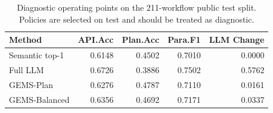 \begin{table}[t]
\centering
\caption{Diagnostic operating points on the 211-workflow public test split. Policies are selected on test and should be treated as diagnostic.}
\label{tab:test211-operating-points}
\begin{tabular}{lrrrr}
\toprule
Method & API.Acc & Plan.Acc & Para.F1 & LLM Change \\
\midrule
Semantic top-1 & 0.6148 & 0.4502 & 0.7010 & 0.0000 \\
Full LLM & 0.6726 & 0.3886 & 0.7502 & 0.5762 \\
\textsc{GEMS}-Plan & 0.6276 & 0.4787 & 0.7110 & 0.0161 \\
\textsc{GEMS}-Balanced & 0.6356 & 0.4692 & 0.7171 & 0.0337 \\
\bottomrule
\end{tabular}
\end{table}
